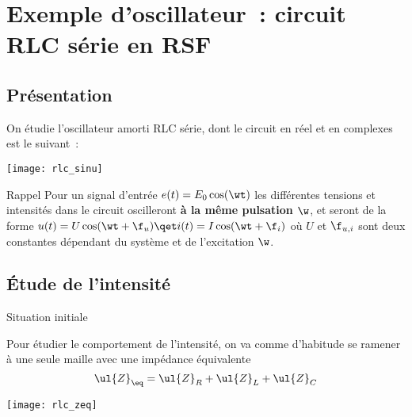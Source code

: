 \documentclass[../main/main.tex]{subfiles}
\begin{document}
\section{Exemple d'oscillateur~: circuit RLC série en RSF}
\subsection{Présentation}

On étudie l'oscillateur amorti RLC série, dont le circuit en réel et en
complexes est le suivant~:
\begin{center}
    \texttt{[image: rlc\_sinu]}
\end{center}

\begin{rrapp}{Rappel}
    Pour un signal d'entrée $e(t) = E_0 \cos(\wt)$ les différentes tensions et
    intensités dans le circuit oscilleront \textbf{à la même pulsation $\w$}, et
    seront de la forme $u(t) = U\cos(\wt+\f_u) \qet i(t) = I\cos(\wt+\f_i)$ où
    $U$ et $\f_{u,i}$ sont deux constantes dépendant du système et de
    l'excitation $\w$.
\end{rrapp}

\subsection{Étude de l'intensité}
\begin{rdefi}{Situation initiale}
    \begin{minipage}{0.70\linewidth}
        Pour étudier le comportement de l'intensité, on va comme d'habitude se
        ramener à une seule maille avec une impédance équivalente
        \[\ul{Z}_{\eq} = \ul{Z}_R + \ul{Z}_L + \ul{Z}_C\]
    \end{minipage}
    \hfill
    \begin{minipage}{0.25\linewidth}
        \begin{center}
            \texttt{[image: rlc\_zeq]}
        \end{center}
    \end{minipage}
\end{rdefi}
\vspace{-20pt}
\end{document}

